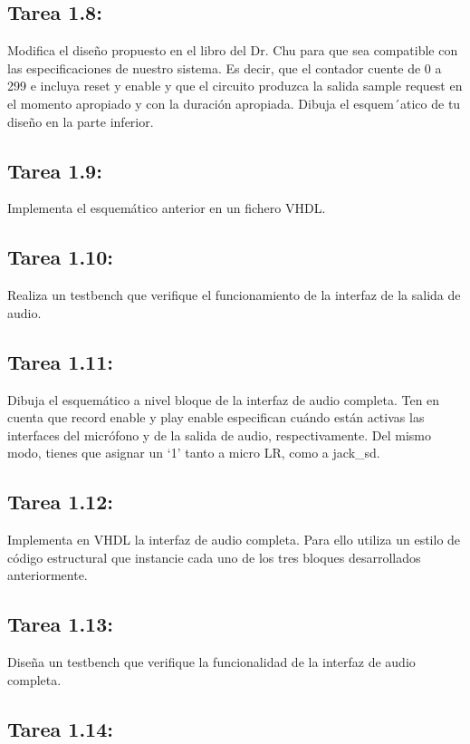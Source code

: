 \documentclass{article}
\begin{document}
\subsection{Tarea 1.8:}
Modifica el diseño propuesto en el libro del Dr. Chu para que sea compatible con las especificaciones de nuestro sistema. Es decir, que el contador cuente de 0 a 299 e incluya reset y enable y que el circuito produzca la salida sample request en el momento apropiado y con la duración apropiada. Dibuja el esquem´atico de tu diseño en la parte inferior.

\subsection{Tarea 1.9:}
Implementa el esquemático anterior en un fichero VHDL.

\subsection{Tarea 1.10:}
Realiza un testbench que verifique el funcionamiento de la interfaz de la salida de audio.

\subsection{Tarea 1.11:}
Dibuja el esquemático a nivel bloque de la interfaz de audio completa. Ten en cuenta que record enable y play enable especifican cuándo están activas las interfaces del micrófono y de la salida de audio, respectivamente. Del mismo modo, tienes que asignar un `1' tanto a micro LR, como a jack{\_}sd.

\subsection{Tarea 1.12:}
Implementa en VHDL la interfaz de audio completa. Para ello utiliza un estilo de código estructural que instancie cada uno de los tres bloques desarrollados anteriormente.

\subsection{Tarea 1.13:}
Diseña un testbench que verifique la funcionalidad de la interfaz de audio completa.

\subsection{Tarea 1.14:}
\end{document}
